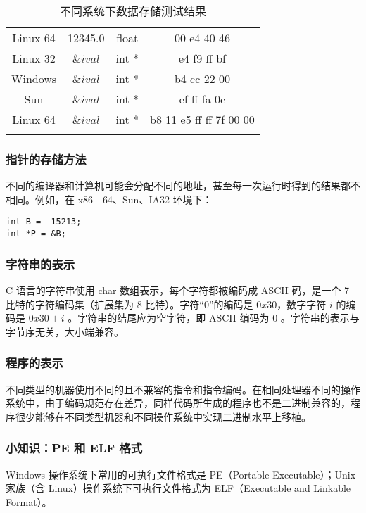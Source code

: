 \begin{table}[H]
\begin{tabular}{cccc}
        Linux 64                       & 12345.0                                 & float                          & 00 e4 40 46                          \\
        Linux 32                       & \(      \& ival\)                       & int *                          & e4 f9 ff bf                          \\
        Windows                        & \(                            \& ival\) & int *                          & b4 cc 22 00                          \\
        Sun                            & \(                            \& ival\) & int *                          & ef ff fa 0c                          \\
        Linux 64                       & \(                            \& ival\) & int *                          & b8 11 e5 ff ff 7f 00 00              \\
        \noalign{\global\setlength{\arrayrulewidth}{1pt}}
        \hline
    \end{tabular}
    \caption{不同系统下数据存储测试结果}
\end{table}
\subsubsection{指针的存储方法}
不同的编译器和计算机可能会分配不同的地址，甚至每一次运行时得到的结果都不相同。例如，在 x86 - 64、Sun、IA32 环境下：
\begin{verbatim}
int B = -15213; 
int *P = &B;
\end{verbatim}
\subsubsection{字符串的表示}
C 语言的字符串使用 char 数组表示，每个字符都被编码成 ASCII 码，是一个 7 比特的字符编码集（扩展集为 8 比特）。字符“0”的编码是 \(0x30\)，数字字符 \(i\) 的编码是 \(0x30 + i\) 。字符串的结尾应为空字符，即 ASCII 编码为 0 。字符串的表示与字节序无关，大小端兼容。
\subsubsection{程序的表示}
不同类型的机器使用不同的且不兼容的指令和指令编码。在相同处理器不同的操作系统中，由于编码规范存在差异，同样代码所生成的程序也不是二进制兼容的，程序很少能够在不同类型机器和不同操作系统中实现二进制水平上移植。
\subsubsection{小知识：PE 和 ELF 格式}
Windows 操作系统下常用的可执行文件格式是 PE（Portable Executable）；Unix 家族（含 Linux）操作系统下可执行文件格式为 ELF（Executable and Linkable Format）。
